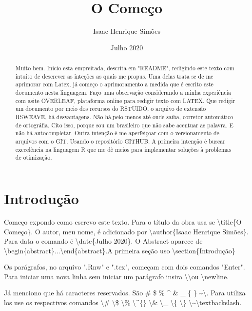 \documentclass[12pt,twoside]{article}
\title{O Começo}
\author{Isaac Henrique Simões}
\date{Julho 2020}
\begin{document}


  \maketitle

\begin{abstract}
Muito bem. Inicio esta empreitada, descrita em "README", redigindo este texto com intuito de descrever as inteções as quais me propus. Uma delas trata se de me aprimorar com Latex, já começo o aprimoramento a medida que é escrito este documento nesta linguagem. Faço uma observação considerando a minha experiência com asite OVERLEAF, plataforma online para redigir texto com LATEX. Que redigir um documento por meio dos recursos do RSTUIDO, o arquivo de extensão RSWEAVE, há  desvantagens. Não há,pelo menos até onde saiba, corretor automático de ortográfia. Cito isso, porque sou um brasileiro que não sabe acentuar as palavra. E não há autocompletar.
Outra intenção é me aperfeiçoar com o versionamento de arquivos com o GIT. Usando o repositório GITHUB. 
A primeira intenção é buscar execelência na linguagem R que me dê meios para implementar soluções à problemas de otimização.
\end{abstract}

\section{Introdução}

Começo expondo como escrevo este texto. Para o título da obra usa se \textbackslash{title}\{O Começo\}. O autor, meu nome, é adicionado por \textbackslash{author}\{Isaac Henrique Simões\}. Para data o comando é \textbackslash{date}\{Julho 2020\}. O Abstract aparece de \textbackslash{begin}\{abstract\}...\textbackslash{end}\{abstract\}.A primeira seção uso \textbackslash{section}\{Introdução\}

Os parágrafos, no arquivo ".Rnw" e ".tex", começam com dois comandos "Enter". Para iniciar uma nova linha sem iniciar um parágrafo insira \textbackslash \textbackslash  ou \textbackslash newline.

Já menciono que há caracteres reservados. São \# \$ \% \^{} \& \_ \{ \} \textasciitilde \textbackslash. Para utiliza los use os respectivos comandos \textbackslash\# \textbackslash\$ \textbackslash\% \textbackslash \^{}\{\} \textbackslash\& \textbackslash\_ \textbackslash\{ \textbackslash\} \textbackslash\textasciitilde \textbackslash textbackslash.
\end{document}
